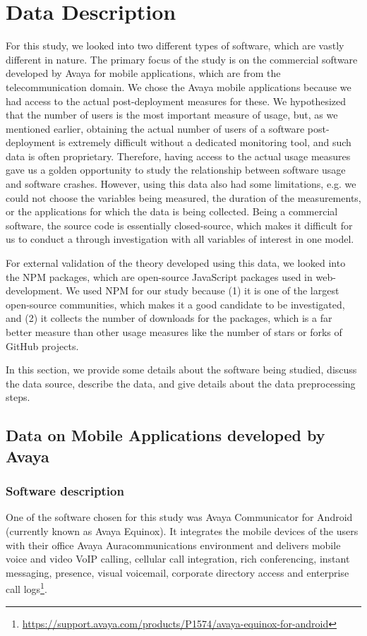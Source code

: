 \documentclass[smallcondensed]{svjour3}     %
\begin{document}
\vspace{-10pt}
\section{Data Description}\label{s:data}

For this study, we looked into two different types of software, which are vastly different in nature. The primary focus of the study is on the commercial software developed by Avaya for mobile applications, which are from the telecommunication domain.  We chose the Avaya mobile applications because we had access to the actual post-deployment measures for these. We hypothesized that the number of users is the most important measure of usage, but, as we mentioned earlier, obtaining the actual number of users of a software post-deployment is extremely difficult without a dedicated monitoring tool, and such data is often proprietary. 
Therefore, having access to the actual usage measures gave us a golden opportunity to study the relationship between software usage and software crashes. However, using this data also had some limitations, e.g. we could not choose the variables being measured, the duration of the measurements, or the applications for which the data is being collected. Being a commercial software, the source code is essentially closed-source, which makes it difficult for us to conduct a through investigation with all variables of interest in one model.

For external validation of the theory developed using this data, we looked into the NPM packages, which are open-source JavaScript packages used in web-development. We used NPM for our study because (1) it is one of the largest open-source communities, which makes it a good candidate to be investigated, and (2) it collects the number of downloads for the packages, which is a far better measure than other usage measures like the number of stars or forks of GitHub projects. 

In this section, we provide some details about the software being studied, discuss the data source, describe the data, and give details about the data preprocessing steps.


\subsection{Data on Mobile Applications developed by Avaya}

\subsubsection{Software description}\label{sub:soft} 
One of the software chosen for this study was Avaya Communicator for
Android (currently known as Avaya Equinox\textregistered ). It
integrates the mobile devices of the users with their office Avaya
Aura\textregistered communications environment and delivers mobile
voice and video VoIP calling, cellular call integration, rich
conferencing, instant messaging, presence, visual voicemail,
corporate directory access and enterprise call logs\footnote{\url{https://support.avaya.com/products/P1574/avaya-equinox-for-android}}.
\end{document}
